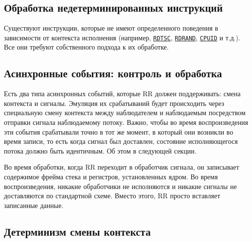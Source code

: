 
\subsection{Обработка недетерминированных инструкций}

Существуют инструкции, которые не имеют определенного поведения в зависимости от контекста исполнения 
(например, 
\href{https://ru.wikipedia.org/wiki/Rdtsc}{\texttt{RDTSC}}, 
\href{https://en.wikipedia.org/wiki/RDRAND}{\texttt{RDRAND}}, 
\href{https://en.wikipedia.org/wiki/CPUID}{\texttt{CPUID}} и т.д.). Все они требуют собственного подхода к их обработке.


\subsection{Асинхронные события: контроль и обработка}

Есть два типа асинхронных событий, которые RR должен поддерживать: смена контекста и сигналы.
Эмуляция их срабатываний будет происходить через специальную смену контекста между наблюдателем и наблюдаемым посредством отправки 
сигнала наблюдаемому потоку. Важно, чтобы во время воспроизведения эти события срабатывали точно в тот же момент, 
в который они возникли во время записи, то есть когда сигнал был доставлен, состояние исполняющегося потока должно быть идентичным.
Об этом в следующей секции.

Во время обработки, когда RR переходит в обработчик сигнала, он записывает содержимое фрейма стека и регистров, установленных ядром. 
Во время воспроизведения, никакие обработчики не исполняются и никакие сигналы не доставляются по стандартной схеме. 
Вместо этого, RR просто вставляет записанные данные.

\subsection{Детерминизм смены контекста}

